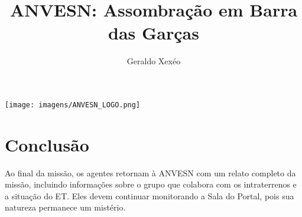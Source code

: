 \documentclass[a4paper,12pt]{book}
\title{ANVESN: Assombração em Barra das Garças}
\author{Geraldo Xexéo}
\date{}
\begin{document}
 

\maketitle
\begin{center}
\newpage
\vspace*{\fill}
\texttt{[image: imagens/ANVESN\_LOGO.png]}
\vspace*{\fill}
\newpage
\end{center}
\tableofcontents









\chapter{Conclusão}

Ao final da missão, os agentes retornam à ANVESN com um relato completo da missão, incluindo informações sobre o grupo que colabora com os intraterrenos e a situação do ET. Eles devem continuar monitorando a Sala do Portal, pois sua natureza permanece um mistério.





\appendix



\printindex
\end{document}
